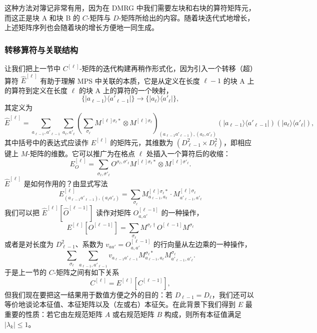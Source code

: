 \documentclass[a4paper,10pt,oneside,onecolumn,1p,times]{elsarticle}
\newcommand{\bra}[1]{\mbox{$\langle #1  |$}}
\newcommand{\ket}[1]{\mbox{$| #1  \rangle$}}
\begin{document}
这种方法对簿记非常有用，因为在 DMRG 中我们需要左块和右块的算符矩阵元，而这正是块 A 和块 B 的 $C$-矩阵与 $D$-矩阵所给出的内容。随着块迭代式地增长，上述矩阵序列也会随着块的增长方便地一同生成。

\subsubsection{转移算符与关联结构}
\label{subsubsec:transferoperator}
让我们把上一节中 $C^{[\ell]}$-矩阵的迭代构建再稍作形式化，因为引入一个转移（超）算符 $\hat{E}^{[\ell]}$ 有助于理解 MPS 中关联的本质，它是从定义在长度 $\ell-1$ 的块 A 上的算符到定义在长度 $\ell$ 的块 A 上的算符的一个映射，
\begin{equation}
\{ \ket{a_{\ell-1}} \bra{a'_{\ell-1}} \} \rightarrow \{ \ket{a_{\ell}} \bra{a'_{\ell}} \},
\end{equation}
其定义为
\begin{equation}
\hat{E}^{[\ell]} = \sum_{a_{\ell-1},a'_{\ell-1}} \sum_{a_\ell,a'_\ell} \left( \sum_{\sigma_\ell} M^{[\ell]\sigma_\ell *} \otimes M^{[\ell]\sigma_\ell} \right)_{(a_{\ell-1}a'_{\ell-1}),(a_\ell,a'_\ell)} (\ket{a_{\ell-1}} \bra{a'_{\ell-1}}) (\ket{a_{\ell}} \bra{a'_{\ell}}),
\end{equation}
其中括号中的表达式应读作 $E^{[\ell]}$ 的矩阵元，其维数为 $(D^2_{\ell-1} \times D^2_{\ell})$，即相应键上 $M$-矩阵的维数。它可以推广为在格点 $\ell$ 处插入一个算符后的收缩：
\begin{equation}
E^{[\ell]}_O = \sum_{\sigma_\ell,\sigma'_\ell} O^{\sigma_\ell,\sigma'_\ell} M^{[\ell]\sigma_\ell *} \otimes M^{[\ell]\sigma'_\ell} .
\end{equation}
$\hat{E}^{[\ell]} $ 是如何作用的？由显式写法
\begin{equation}
E^{[\ell]}_{(a_{\ell-1}a'_{\ell-1}),(a_{\ell}a'_{\ell})} = \sum_{\sigma_\ell} M^{[\ell]\sigma_\ell *}_{a_{\ell-1},a_\ell} \cdot M^{[\ell]\sigma_\ell}_{a'_{\ell-1},a'_\ell}
\end{equation}
我们可以把 $\hat{E}^{[\ell]}[ \hat{O}^{[\ell-1]}]$ 读作对矩阵 $O^{[\ell-1]}_{a,a'}$ 的一种操作，
\begin{equation}
E^{[\ell]} [O^{[\ell-1]}]  = \sum_{\sigma_\ell} M^{\sigma_\ell\dagger} O^{[\ell-1]} M^{\sigma_\ell}
\end{equation}
或者是对长度为 $D_{\ell-1}^2$、系数为 $v_{aa'} = O^{[\ell-1]}_{a,a'}$ 的行向量从左边乘的一种操作，
\begin{equation}
\sum_{\sigma_\ell} \sum_{a_{\ell-1},a'_{\ell-1}} v_{a_{\ell-1}a'_{\ell-1}} M^{\sigma_\ell*}_{a_{\ell-1},a_\ell} M^{\sigma_\ell}_{a'_{\ell-1},a'_\ell} .
\end{equation}
于是上一节的 $C$-矩阵之间有如下关系
\begin{equation}
C^{[\ell]} = E^{[\ell]} [C^{[\ell-1]}]  ,
\end{equation}
但我们现在要把这一结果用于数值方便之外的目的：若 $D_{\ell-1}=D_\ell$，我们还可以等价地谈论本征值、本征矩阵以及（左或右）本征矢。在此背景下我们得到 $E$ 最重要的性质：若它由左规范矩阵 $A$ 或右规范矩阵 $B$ 构成，则所有本征值满足 $|\lambda_k| \leq 1$。
\end{document}
